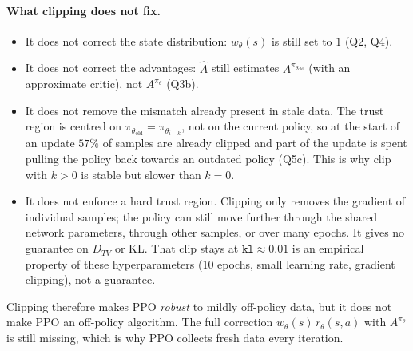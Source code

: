 \documentclass[11pt]{article}
\newcommand{\piold}{\pi_{\theta_{\mathrm{old}}}}
\newcommand{\Ahat}{\hat{A}}
\newcommand{\code}[1]{\texttt{#1}}
\begin{document}
\paragraph{What clipping does not fix.}
\begin{itemize}[nosep,leftmargin=*]
  \item It does not correct the state distribution: $w_\theta(s)$ is still set to $1$ (Q2, Q4).
  \item It does not correct the advantages: $\Ahat$ still estimates $A^{\piold}$ (with an approximate critic), not $A^{\pi_\theta}$ (Q3b).
  \item It does not remove the mismatch already present in stale data. The trust region is centred on
        $\piold=\pi_{\theta_{i-k}}$, not on the current policy, so at the start of an update $57\%$ of samples are already
        clipped and part of the update is spent pulling the policy back towards an outdated policy (Q5c). This is why
        clip with $k>0$ is stable but slower than $k=0$.
  \item It does not enforce a hard trust region. Clipping only removes the gradient of individual
        samples; the policy can still move further through the shared network parameters, through other samples, or over
        many epochs. It gives no guarantee on $D_{TV}$ or KL. That clip stays at $\code{kl}\approx0.01$ is an empirical
        property of these hyperparameters (10 epochs, small learning rate, gradient clipping), not a guarantee.
\end{itemize}
Clipping therefore makes PPO \emph{robust} to mildly off-policy data, but it does not make PPO an off-policy
algorithm. The full correction $w_\theta(s)\,r_\theta(s,a)$ with $A^{\pi_\theta}$ is still missing, which is why PPO
collects fresh data every iteration.
\end{document}
